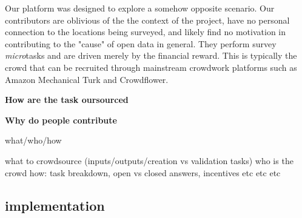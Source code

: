 Our platform was designed to explore a somehow opposite scenario. Our contributors are oblivious of the the context of the project, have no personal connection to the locations being surveyed, and likely find no motivation in contributing to the "cause" of open data in general. They perform survey {\it micro}tasks and are driven merely by the financial reward. This is typically the crowd that can be recruited through mainstream crowdwork platforms such as Amazon Mechanical Turk and Crowdflower. 

\textbf{How are the task oursourced}

\textbf{Why do people contribute}


what/who/how

what to crowdsource (inputs/outputs/creation vs validation tasks)
who is the crowd 
how: task breakdown, open vs closed answers, incentives etc etc etc

\subsection{implementation}